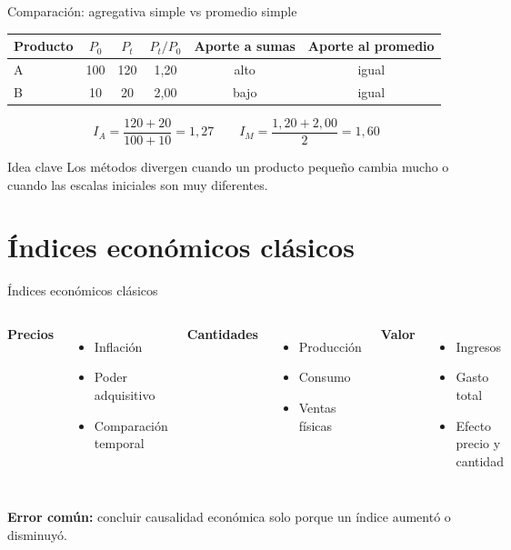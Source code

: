 \documentclass[aspectratio=169,11pt]{beamer}
\newcommand{\errorcomun}[1]{\textbf{Error común:} #1}
\begin{document}
\begin{frame}{Comparación: agregativa simple vs promedio simple}
\small
\begin{center}
\begin{tabular}{lccccc}
\toprule
Producto & $P_0$ & $P_t$ & $P_t/P_0$ & Aporte a sumas & Aporte al promedio \\
\midrule
A & 100 & 120 & 1,20 & alto & igual \\
B & 10 & 20 & 2,00 & bajo & igual \\
\bottomrule
\end{tabular}
\end{center}
\[
I_A=\frac{120+20}{100+10}=1{,}27 \qquad
I_M=\frac{1{,}20+2{,}00}{2}=1{,}60
\]
\begin{block}{Idea clave}
Los métodos divergen cuando un producto pequeño cambia mucho o cuando las escalas iniciales son muy diferentes.
\end{block}
\end{frame}

\section{Índices económicos clásicos}

\begin{frame}{Índices económicos clásicos}
\begin{columns}[T]
\textbf{Precios}
\begin{itemize}
  \item Inflación
  \item Poder adquisitivo
  \item Comparación temporal
\end{itemize}
\textbf{Cantidades}
\begin{itemize}
  \item Producción
  \item Consumo
  \item Ventas físicas
\end{itemize}
\textbf{Valor}
\begin{itemize}
  \item Ingresos
  \item Gasto total
  \item Efecto precio y cantidad
\end{itemize}
\end{columns}
\vspace{0.5em}
\errorcomun{concluir causalidad económica solo porque un índice aumentó o disminuyó.}
\end{frame}
\end{document}
